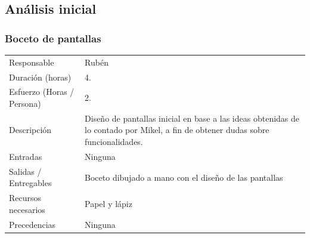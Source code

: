 \subsection{An\'{a}lisis inicial}
\subsubsection{Boceto de pantallas}
\begin{table}[H]
    \begin{center}
        \begin{tabular}{l p{8cm}}
            Responsable                           & Rub\'{e}n \\
            Duraci\'{o}n (horas)                  & 4. \\ 
            Esfuerzo (Horas / Persona)            & 2. \\
            Descripci\'{o}n                       & Diseño de pantallas inicial en base a las ideas obtenidas de lo
                                                    contado por Mikel, a fin de obtener dudas sobre funcionalidades. \\
            Entradas                              & Ninguna \\
            Salidas / Entregables                 & Boceto dibujado a mano con el dise\~{n}o de las pantallas \\
            Recursos necesarios                   & Papel y l\'{a}piz \\
            Precedencias                          & Ninguna \\
        \end{tabular}
    \end{center}
            
\end{table}

